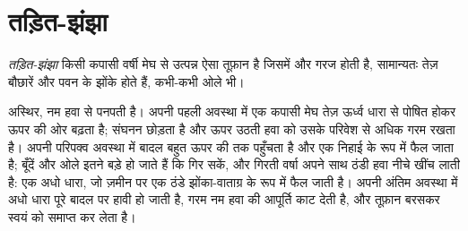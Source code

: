 \section{तड़ित-झंझा}

\begin{definition}[तड़ित-झंझा]\label{def:g10:storms-and-cyclones:thunderstorm}
\emph{तड़ित-झंझा} किसी कपासी वर्षी मेघ से उत्पन्न ऐसा तूफ़ान है
जिसमें  और गरज होती है, सामान्यतः तेज़ बौछारें
और पवन के झोंके होते हैं, कभी-कभी ओले भी।
\end{definition}

 अस्थिर, नम हवा से पनपती है। अपनी पहली अवस्था में एक कपासी मेघ
तेज़ ऊर्ध्व धारा से पोषित होकर ऊपर की ओर बढ़ता है; संघनन  छोड़ता है
और ऊपर उठती हवा को उसके परिवेश से अधिक गरम रखता है। अपनी परिपक्व अवस्था में
बादल बहुत ऊपर की  तक पहुँचता है और एक निहाई के रूप में फैल जाता है;
बूँदें और ओले इतने बड़े हो जाते हैं कि गिर सकें, और गिरती वर्षा अपने साथ
ठंडी हवा नीचे खींच लाती है: एक अधो धारा, जो ज़मीन पर एक ठंडे झोंका-वाताग्र के रूप में
फैल जाती है। अपनी अंतिम अवस्था में अधो धारा पूरे बादल पर हावी हो जाती है,
गरम नम हवा की आपूर्ति काट देती है, और तूफ़ान बरसकर स्वयं को
समाप्त कर लेता है।

